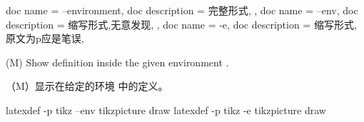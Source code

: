 \begin{docKeys}[
doc no index,   %
doc parameter = {~\meta{env}},
]
{
{
    doc name        = --environment,
    doc description = 完整形式,
},
{
    doc name        = --env,
    doc description = {缩写形式,无意发现},
},
{
    doc name        = -e,
    doc description = {缩写形式,原文为p应是笔误},
}
}

(M) Show definition inside the given environment .

（M）显示在给定的环境 中的定义。


\begin{commandshell} 
latexdef -p tikz --env tikzpicture draw
latexdef -p tikz -e tikzpicture draw 
\end{commandshell}  
\end{docKeys}

